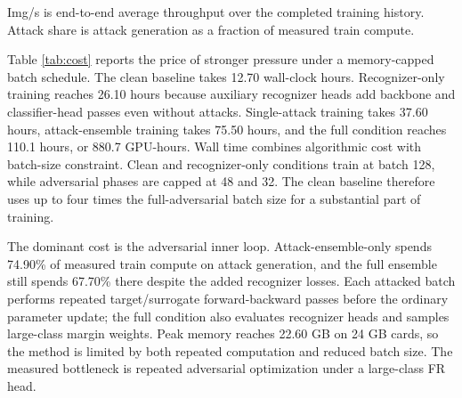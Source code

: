 \documentclass[conference]{IEEEtran}
\begin{document}
\begin{table}[!t]
\centering
\caption{Training cost measured from completed 24-epoch histories on 8 GPUs.
Wall time includes training, validation, verification, and model-saving overhead.
Batch lists the dominant active per-GPU batch size.}
\label{tab:cost}
\vspace{1mm}
\parbox{\columnwidth}{\centering\footnotesize\setlength{\baselineskip}{8pt}
Img/s is end-to-end average throughput over the completed training history. Attack share is attack generation as a fraction of measured train compute.}
\end{table}

Table \ref{tab:cost} reports the price of stronger pressure under a
memory-capped batch schedule. The clean baseline takes 12.70 wall-clock hours.
Recognizer-only training reaches 26.10 hours because auxiliary recognizer
heads add backbone and classifier-head passes even without attacks.
Single-attack training takes 37.60 hours, attack-ensemble training takes
75.50 hours, and the full condition reaches 110.1 hours, or 880.7 GPU-hours.
Wall time combines algorithmic cost with batch-size constraint. Clean and
recognizer-only conditions train at batch 128, while adversarial phases are
capped at 48 and 32. The clean baseline therefore uses up to four times the
full-adversarial batch size for a substantial part of training.

The dominant cost is the adversarial inner loop. Attack-ensemble-only spends
74.90\% of measured train compute on attack generation, and the full ensemble
still spends 67.70\% there despite the added recognizer losses. Each attacked
batch performs repeated target/surrogate forward-backward passes before the
ordinary parameter update; the full condition also evaluates recognizer heads
and samples large-class margin weights. Peak memory reaches 22.60 GB on 24 GB
cards, so the method is limited by both repeated computation and reduced batch
size. The measured bottleneck is repeated adversarial optimization under a
large-class FR head.
\end{document}
